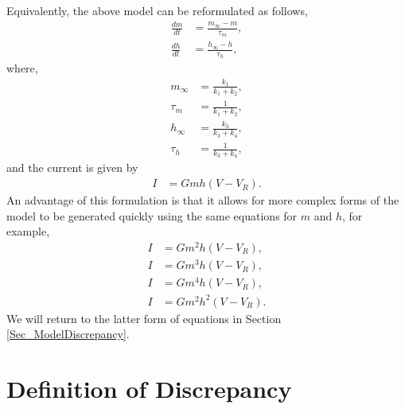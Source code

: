 \documentclass[11pt,a4paper,oneside]{article}
\begin{document}
Equivalently, the above model can be reformulated as follows,
\begin{align}
\frac{dm}{dt} & = \frac{m_{\infty} - m}{\tau_m},\\ \label{Eq_dmdt}
\frac{dh}{dt} & = \frac{h_{\infty} - h}{\tau_h},
\end{align}
where, 
\begin{align}
m_{\infty} & = \frac{k_1}{k_1+k_2},\\
\tau_{m} & = \frac{1}{k_1+k_2},\\
h_{\infty} & = \frac{k_3}{k_3+k_4},\\
\tau_{h} & = \frac{1}{k_3+k_4},
\end{align}
and the current is given by
\begin{align}
I & = G m h(V-V_R). \label{Eq_mh}
\end{align}
An advantage of this formulation is that it allows for more complex forms of the model to be generated quickly using the same equations for $m$ and $h$, for example,
\begin{align}
I & = G m^2 h(V-V_R), \label{Eq_m2h} \\
I & = G m^3 h(V-V_R),\\
I & = G m^4 h(V-V_R),\\
I & = G m^2 h^2(V-V_R). \label{Eq_m2h2}
\end{align}
We will return to the latter form of equations in Section \ref{Sec_ModelDiscrepancy}.


\section{Definition of Discrepancy} \label{Sec_ModelsOfDiscrepancy}
\end{document}
